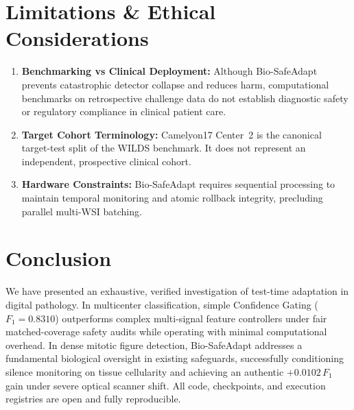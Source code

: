 \documentclass[conference]{IEEEtran}
\begin{document}
\section{Limitations \& Ethical Considerations}
\begin{enumerate}
    \item \textbf{Benchmarking vs Clinical Deployment:} Although Bio-SafeAdapt prevents catastrophic detector collapse and reduces harm, computational benchmarks on retrospective challenge data do not establish diagnostic safety or regulatory compliance in clinical patient care.
    \item \textbf{Target Cohort Terminology:} Camelyon17 Center~2 is the canonical target-test split of the WILDS benchmark. It does not represent an independent, prospective clinical cohort.
    \item \textbf{Hardware Constraints:} Bio-SafeAdapt requires sequential processing to maintain temporal monitoring and atomic rollback integrity, precluding parallel multi-WSI batching.
\end{enumerate}

\section{Conclusion}
We have presented an exhaustive, verified investigation of test-time adaptation in digital pathology. In multicenter classification, simple Confidence Gating ($F_1 = 0.8310$) outperforms complex multi-signal feature controllers under fair matched-coverage safety audits while operating with minimal computational overhead. In dense mitotic figure detection, Bio-SafeAdapt addresses a fundamental biological oversight in existing safeguards, successfully conditioning silence monitoring on tissue cellularity and achieving an authentic $+0.0102$\,$F_1$ gain under severe optical scanner shift. All code, checkpoints, and execution registries are open and fully reproducible.
\end{document}
